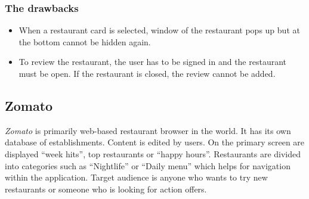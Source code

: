 \subsubsection{The drawbacks}
\begin{itemize}
    \item When a restaurant card is selected, window of the restaurant pops up but at the bottom cannot be hidden again.
    \item To review the restaurant, the user has to be signed in and the restaurant must be open. If the restaurant is closed, the review cannot be added.
\end{itemize}

\subsection{Zomato}
\textit{Zomato} is primarily web-based restaurant browser in the world. It has its own database of establishments. Content is edited by users.  
On the primary screen are displayed ``week hits'', top restaurants or ``happy hours''. Restaurants are divided into categories such as ``Nightlife'' or ``Daily menu'' which helps for navigation within the application.
Target audience is anyone who wants to try new restaurants or someone who is looking for action offers.


